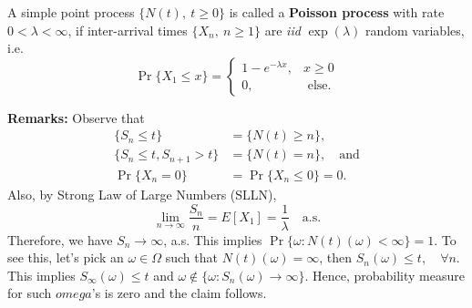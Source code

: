 \documentclass[a4paper,10pt]{article}
\begin{document}
\begin{defn}
A simple point process $\{N(t),~ t\geqslant0\} $ is called a \textbf{Poisson process} with rate $0< \lambda< \infty$, if inter-arrival times $\{X_{n},~n\geqslant 1\}$ are \emph{iid} $\exp(\lambda)$ random variables, i.e.
 \begin{equation*}
  \Pr\{X_{1}\leqslant x\} = 
	\begin{cases}
		1-e^{-\lambda x}, & x\geqslant 0   \\
		0,  & \text{ else}.
	\end{cases}
\end{equation*}
\end{defn}

\textbf{Remarks:} Observe that 
\begin{align*}
\{S_{n}\leqslant t\} &=  \{N(t)\geqslant n \},\\
\{S_{n}\leqslant t, S_{n+1}> t \} &= \{N(t)= n\},\quad\mathrm{and} \\
\Pr\{X_{n} = 0\} &= \Pr\{X_n\leqslant 0\} = 0.
\end{align*}
Also, by Strong Law of Large Numbers (SLLN), 
\begin{equation*}
\lim_{n \to \infty} \frac{S_{n}}{n} = E[X_{1}] = \frac{1}{\lambda}\quad\mathrm{a.s.} 
\end{equation*}
Therefore, we have $S_n \rightarrow \infty$, a.s. This implies $\Pr\{\omega: N(t)(\omega) < \infty\} =1$. To see this, let's pick an $\omega \in \Omega$ such that $ N(t)(\omega) = \infty$, then $S_{n}(\omega)\leqslant t,\quad \forall n$. This implies $S_{\infty}(\omega)\leqslant t$  and $\omega \not\in \{\omega: S_{n}(\omega) \rightarrow \infty \}.$ Hence, probability measure for such $omega$'s is zero and the claim follows. 
\end{document}
